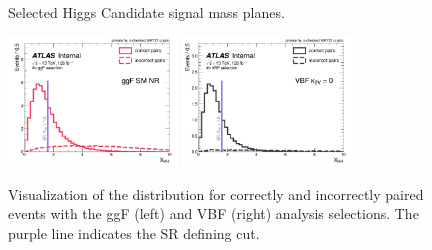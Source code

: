 \begin{figure}[ht]
	\centering
	\caption{Selected Higgs Candidate signal mass planes.}
	\label{fig:massplanes-allYrs-signal}
\end{figure}

\begin{figure}[ht]
	\centering
	\includegraphics[width=0.4\textwidth]{figures/nr-int-note/selection/V3/X_hh-ggf-sm-4b.pdf}
	\includegraphics[width=0.4\textwidth]{figures/nr-int-note/selection/V3/X_hh-vbf-k2V_0-4b.pdf}
	\caption{Visualization of the \Xhh distribution for correctly and incorrectly paired events with the ggF (left) and VBF (right) analysis selections. The purple line indicates the SR defining cut.}
	\label{fig:ggF-Xhh}
\end{figure}

